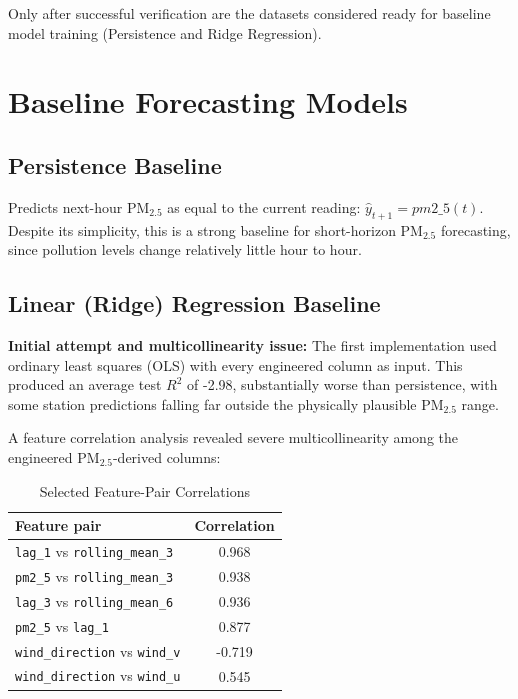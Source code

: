 Only after successful verification are the datasets considered ready for baseline model
training (Persistence and Ridge Regression).

\section{Baseline Forecasting Models}

\subsection{Persistence Baseline}

Predicts next-hour PM$_{2.5}$ as equal to the current reading:
$\hat{y}_{t+1} = pm2\_5(t)$. Despite its simplicity, this is a strong baseline for
short-horizon PM$_{2.5}$ forecasting, since pollution levels change relatively little
hour to hour.

\subsection{Linear (Ridge) Regression Baseline}

\textbf{Initial attempt and multicollinearity issue:} The first implementation used
ordinary least squares (OLS) with every engineered column as input. This produced an
average test $R^2$ of -2.98, substantially worse than persistence, with some station
predictions falling far outside the physically plausible PM$_{2.5}$ range.

A feature correlation analysis revealed severe multicollinearity among the engineered
PM$_{2.5}$-derived columns:

\begin{table}[H]
    \centering
    \small
    \caption{Selected Feature-Pair Correlations}
    \label{tab:selected_feature_pair_correlations}
    \renewcommand{\arraystretch}{1.2}
    \begin{tabular}{|l|c|}
        \hline
        \textbf{Feature pair} & \textbf{Correlation} \\
        \hline
        \texttt{lag\_1} vs \texttt{rolling\_mean\_3} & 0.968 \\
        \hline
        \texttt{pm2\_5} vs \texttt{rolling\_mean\_3} & 0.938 \\
        \hline
        \texttt{lag\_3} vs \texttt{rolling\_mean\_6} & 0.936 \\
        \hline
        \texttt{pm2\_5} vs \texttt{lag\_1} & 0.877 \\
        \hline
        \texttt{wind\_direction} vs \texttt{wind\_v} & -0.719 \\
        \hline
        \texttt{wind\_direction} vs \texttt{wind\_u} & 0.545 \\
        \hline
    \end{tabular}
\end{table}

